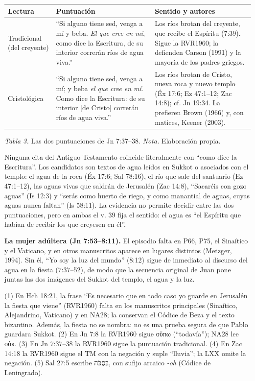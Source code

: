 \documentclass[11pt,letterpaper]{article}
\newcommand{\heb}[1]{\mbox{\foreignlanguage{hebrew}{#1}}}
\newcommand{\grc}[1]{\foreignlanguage{ancientgreek}{#1}}
\begin{document}
\begin{center}\small\renewcommand{\arraystretch}{1.25}
\begin{tabular}{@{}L{2.6cm}L{6.4cm}L{5.4cm}@{}}
\toprule
\textbf{Lectura} & \textbf{Puntuación} & \textbf{Sentido y autores} \\ \midrule
Tradicional (del creyente) & ``Si alguno tiene sed, venga a mí y beba. \emph{El que cree en mí}, como dice la Escritura, de su interior correrán ríos de agua viva.'' & Los ríos brotan del creyente, que recibe el Espíritu (7:39). Sigue la RVR1960; la defienden Carson (1991) y la mayoría de los padres griegos. \\
Cristológica & ``Si alguno tiene sed, venga a mí; y beba \emph{el que cree en mí}. Como dice la Escritura: de su interior [de Cristo] correrán ríos de agua viva.'' & Los ríos brotan de Cristo, nueva roca y nuevo templo (Éx 17:6; Ez 47:1--12; Zac 14:8); cf. Jn 19:34. La prefieren Brown (1966) y, con matices, Keener (2003). \\
\bottomrule
\end{tabular}\par
{\footnotesize\color{sepia}\textit{Tabla 3.} Las dos puntuaciones de Jn 7:37--38. \textit{Nota.} Elaboración propia.}
\end{center}

Ninguna cita del Antiguo Testamento coincide literalmente con ``como dice la Escritura''. Los candidatos son textos de agua leídos en Sukkot o asociados con el templo: el agua de la roca (Éx 17:6; Sal 78:16), el río que sale del santuario (Ez 47:1--12), las aguas vivas que saldrán de Jerusalén (Zac 14:8), ``Sacaréis con gozo aguas'' (Is 12:3) y ``serás como huerto de riego, y como manantial de aguas, cuyas aguas nunca faltan'' (Is 58:11). La evidencia no permite decidir entre las dos puntuaciones, pero en ambas el v. 39 fija el sentido: el agua es ``el Espíritu que habían de recibir los que creyesen en él''.

\textbf{La mujer adúltera (Jn 7:53--8:11).} El episodio falta en P66, P75, el Sinaítico y el Vaticano, y en otros manuscritos aparece en lugares distintos (Metzger, 1994). Sin él, ``Yo soy la luz del mundo'' (8:12) sigue de inmediato al discurso del agua en la fiesta (7:37--52), de modo que la secuencia original de Juan pone juntas las dos imágenes del Sukkot del templo, el agua y la luz.

\begin{nota}
(1) En Hch 18:21, la frase ``Es necesario que en todo caso yo guarde en Jerusalén la fiesta que viene'' (RVR1960) falta en los manuscritos principales (Sinaítico, Alejandrino, Vaticano) y en NA28; la conservan el Códice de Beza y el texto bizantino. Además, la fiesta no se nombra: no es una prueba segura de que Pablo guardara Sukkot. (2) En Jn 7:8 la RVR1960 sigue \grc{οὔπω} (``todavía''); NA28 lee \grc{οὐκ}. (3) En Jn 7:37--38 la RVR1960 sigue la puntuación tradicional. (4) En Zac 14:18 la RVR1960 sigue el TM con la negación y suple ``lluvia''; la LXX omite la negación. (5) Sal 27:5 escribe \heb{בְּסֻכֹּה}, con sufijo arcaico \emph{-oh} (Códice de Leningrado).
\end{nota}
\end{document}

